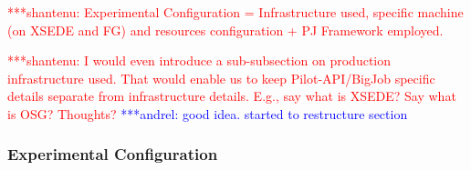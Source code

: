 \documentclass[conference,final]{IEEEtran}
\newcommand{\jhanote}[1]{ {\textcolor{red} { ***shantenu: #1 }}}
\newcommand{\alnote}[1]{ {\textcolor{blue} { ***andrel: #1 }}}
\newcommand{\note}[1]{ {\textcolor{magenta} { ***Note: #1 }}}
\newcommand{\alnote}[1]{}
\newcommand{\jhanote}[1]{}
\newcommand{\note}[1]{}
\begin{document}
\jhanote{Experimental Configuration = Infrastructure used, specific
  machine (on XSEDE and FG) and resources configuration + PJ Framework
  employed.}


\jhanote{I would even introduce a sub-subsection on production
  infrastructure used. That would enable us to keep Pilot-API/BigJob
  specific details separate from infrastructure details. E.g., say
  what is XSEDE? Say what is OSG? Thoughts?}
\alnote{good idea. started to restructure section}





\subsubsection*{Experimental Configuration}
\end{document}
